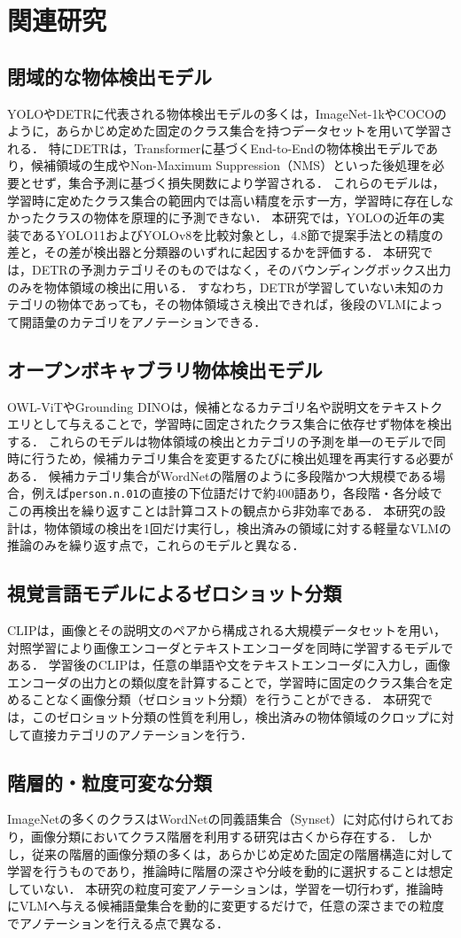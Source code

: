 \section{関連研究}
\subsection{閉域的な物体検出モデル}
YOLO\cite{ref_YOLO}やDETR\cite{ref_DETR}に代表される物体検出モデルの多くは，ImageNet-1k\cite{ref_ImageNet}やCOCO\cite{ref_COCO}のように，あらかじめ定めた固定のクラス集合を持つデータセットを用いて学習される．
特にDETRは，Transformerに基づくEnd-to-Endの物体検出モデルであり，候補領域の生成やNon-Maximum Suppression（NMS）といった後処理を必要とせず，集合予測に基づく損失関数により学習される．
これらのモデルは，学習時に定めたクラス集合の範囲内では高い精度を示す一方，学習時に存在しなかったクラスの物体を原理的に予測できない．
本研究では，YOLOの近年の実装であるYOLO11およびYOLOv8\cite{ref_Ultralytics}を比較対象とし，4.8節で提案手法との精度の差と，その差が検出器と分類器のいずれに起因するかを評価する．
本研究では，DETRの予測カテゴリそのものではなく，そのバウンディングボックス出力のみを物体領域の検出に用いる．
すなわち，DETRが学習していない未知のカテゴリの物体であっても，その物体領域さえ検出できれば，後段のVLMによって開語彙のカテゴリをアノテーションできる．

\subsection{オープンボキャブラリ物体検出モデル}
OWL-ViT\cite{ref_OWLViT}やGrounding DINO\cite{ref_GDINO}は，候補となるカテゴリ名や説明文をテキストクエリとして与えることで，学習時に固定されたクラス集合に依存せず物体を検出する．
これらのモデルは物体領域の検出とカテゴリの予測を単一のモデルで同時に行うため，候補カテゴリ集合を変更するたびに検出処理を再実行する必要がある．
候補カテゴリ集合がWordNetの階層のように多段階かつ大規模である場合，例えば\texttt{person.n.01}の直接の下位語だけで約400語あり，各段階・各分岐でこの再検出を繰り返すことは計算コストの観点から非効率である．
本研究の設計は，物体領域の検出を1回だけ実行し，検出済みの領域に対する軽量なVLMの推論のみを繰り返す点で，これらのモデルと異なる．

\subsection{視覚言語モデルによるゼロショット分類}
CLIP\cite{ref_CLIP}は，画像とその説明文のペアから構成される大規模データセットを用い，対照学習により画像エンコーダとテキストエンコーダを同時に学習するモデルである．
学習後のCLIPは，任意の単語や文をテキストエンコーダに入力し，画像エンコーダの出力との類似度を計算することで，学習時に固定のクラス集合を定めることなく画像分類（ゼロショット分類）を行うことができる．
本研究では，このゼロショット分類の性質を利用し，検出済みの物体領域のクロップに対して直接カテゴリのアノテーションを行う．

\subsection{階層的・粒度可変な分類}
ImageNetの多くのクラスはWordNet\cite{ref_WordNet}の同義語集合（Synset）に対応付けられており，画像分類においてクラス階層を利用する研究は古くから存在する．
しかし，従来の階層的画像分類の多くは，あらかじめ定めた固定の階層構造に対して学習を行うものであり，推論時に階層の深さや分岐を動的に選択することは想定していない．
本研究の粒度可変アノテーションは，学習を一切行わず，推論時にVLMへ与える候補語彙集合を動的に変更するだけで，任意の深さまでの粒度でアノテーションを行える点で異なる．
